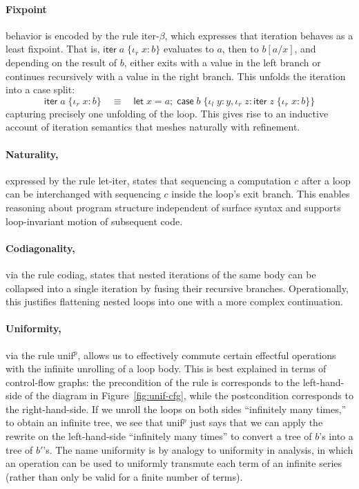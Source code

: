 \documentclass[acmsmall,screen,review]{acmart}
\newcommand{\ms}[1]{\ensuremath{\mathsf{#1}}}
\newcommand{\lto}{:}
\newcommand{\linl}[1]{\iota_l\;{#1}}
\newcommand{\linr}[1]{\iota_r\;{#1}}
\newcommand{\letexpr}[3]{\ensuremath{\ms{let}\;#1 = #2;\;#3}}
\newcommand{\caseexpr}[5]{\ms{case}\;#1\;\{\linl{#2} \lto #3, \linr{#4} \lto #5\}}
\newcommand{\liter}[3]{\ms{iter}\;#1\;\{ \linr{#2} \lto #3 \}}
\begin{document}
\paragraph{Fixpoint} behavior is encoded by the rule \textsf{iter-$\beta$}, which expresses that
iteration behaves as a least fixpoint. That is, $\liter{a}{x}{b}$ evaluates to $a$, then to
$b[a/x]$, and depending on the result of $b$, either exits with a value in the left branch or
continues recursively with a value in the right branch. This unfolds the iteration into a case
split:
\[
\liter{a}{x}{b} \quad \equiv \quad \letexpr{x}{a}{\caseexpr{b}{y}{y}{z}{\liter{z}{x}{b}}}
\]
capturing precisely one unfolding of the loop. This gives rise to an inductive account of iteration
semantics that meshes naturally with refinement.
%
\paragraph{Naturality,} expressed by the rule \textsf{let-iter}, states that sequencing a
computation $c$ after a loop can be interchanged with sequencing $c$ inside the loop’s exit branch.
This enables reasoning about program structure independent of surface syntax and supports
loop-invariant motion of subsequent code.
%
\paragraph{Codiagonality,} via the rule \textsf{codiag}, states that nested iterations of the same
body can be collapsed into a single iteration by fusing their recursive branches. Operationally,
this justifies flattening nested loops into one with a more complex continuation.
%
\paragraph{Uniformity,} via the rule \textsf{unif$^p$}, allows us to effectively commute certain
effectful operations with the infinite unrolling of a loop body. This is best explained in terms of
control-flow graphs: the precondition of the rule is corresponds to the left-hand-side of the
diagram in Figure~\ref{fig:unif-cfg}, while the postcondition corresponds to the right-hand-side. If
we unroll the loops on both sides ``infinitely many times,'' to obtain an infinite tree, we see that
\textsf{unif$^p$} just says that we can apply the rewrite on the left-hand-side ``infinitely many
times'' to convert a tree of $b$'s into a tree of $b'$'s. The name uniformity is by analogy to
uniformity in analysis, in which an operation can be used to uniformly transmute each term of an
infinite series (rather than only be valid for a finite number of terms).
\end{document}
